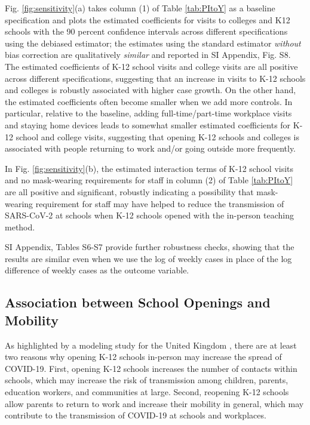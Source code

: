 \documentclass[9pt,twocolumn,twoside,lineno]{pnas-new}
\begin{document}
Fig. \ref{fig:sensitivity}(a) takes column (1) of Table \ref{tab:PItoY} as a baseline specification and plots the estimated coefficients for visits to colleges and K12 schools with the 90 percent confidence intervals across different specifications using the debiased estimator; the estimates using the standard estimator \textit{without} bias correction are qualitatively \textit{similar} and reported in SI Appendix, Fig. S8. The estimated coefficients of K-12 school visits and college visits are all positive across different specifications, suggesting that an increase in visits to K-12 schools and colleges is robustly associated with higher case growth. On the other hand, the estimated coefficients often become smaller when we add more controls. In particular, relative to the baseline, adding full-time/part-time workplace visits and staying home devices leads to somewhat smaller estimated coefficients for K-12 school and college visits, suggesting that opening K-12 schools and colleges is associated with people returning to work and/or going outside more frequently.

In Fig. \ref{fig:sensitivity}(b), the estimated interaction terms of K-12 school visits and no mask-wearing requirements for staff in column (2) of Table \ref{tab:PItoY} are all positive and significant, robustly indicating a possibility that mask-wearing requirement for staff may have helped to reduce the transmission of SARS-CoV-2 at schools when K-12 schools opened with the in-person teaching method.

SI Appendix, Tables S6-S7 provide further robustness checks, showing that the results are similar even when we use the log of weekly cases in place of the log difference of weekly cases as the outcome variable.

\subsection*{Association between School Openings and Mobility}

As highlighted by a modeling study for the United Kingdom
\citep{panovska2020lancet}, there are at least two reasons why opening  K-12 schools in-person may increase the spread of COVID-19. First,  opening K-12 schools increases the number of contacts within schools, which may increase the risk of transmission among children, parents,  education workers, and communities at large. Second, reopening K-12 schools allow parents to return to work and increase their mobility in general,  which may contribute to the transmission of  COVID-19 at schools and workplaces.
\end{document}
